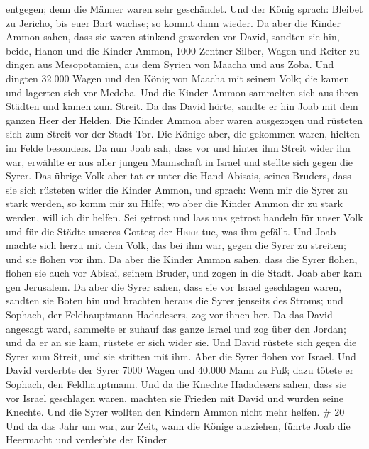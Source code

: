 entgegen; denn die Männer waren sehr geschändet. Und der König sprach:
Bleibet zu Jericho, bis euer Bart wachse; so kommt dann wieder.
 Da aber die Kinder Ammon sahen, dass sie waren stinkend
geworden vor David, sandten sie hin, beide, Hanon und die Kinder Ammon,
1000 Zentner Silber, Wagen und Reiter zu dingen aus Mesopotamien, aus
dem Syrien von Maacha und aus Zoba.  Und dingten 32.000
Wagen und den König von Maacha mit seinem Volk; die kamen und lagerten
sich vor Medeba. Und die Kinder Ammon sammelten sich aus ihren Städten
und kamen zum Streit.  Da das David hörte, sandte er hin
Joab mit dem ganzen Heer der Helden.  Die Kinder Ammon
aber waren ausgezogen und rüsteten sich zum Streit vor der Stadt Tor.
Die Könige aber, die gekommen waren, hielten im Felde besonders.
 Da nun Joab sah, dass vor und hinter ihm Streit wider
ihn war, erwählte er aus aller jungen Mannschaft in Israel und stellte
sich gegen die Syrer.  Das übrige Volk aber tat er unter
die Hand Abisais, seines Bruders, dass sie sich rüsteten wider die
Kinder Ammon,  und sprach: Wenn mir die Syrer zu stark
werden, so komm mir zu Hilfe; wo aber die Kinder Ammon dir zu stark
werden, will ich dir helfen.  Sei getrost und lass uns
getrost handeln für unser Volk und für die Städte unseres Gottes; der
\textsc{Herr} tue, was ihm gefällt.  Und Joab machte sich
herzu mit dem Volk, das bei ihm war, gegen die Syrer zu streiten; und
sie flohen vor ihm.  Da aber die Kinder Ammon sahen, dass
die Syrer flohen, flohen sie auch vor Abisai, seinem Bruder, und zogen
in die Stadt. Joab aber kam gen Jerusalem.  Da aber die
Syrer sahen, dass sie vor Israel geschlagen waren, sandten sie Boten hin
und brachten heraus die Syrer jenseits des Stroms; und Sophach, der
Feldhauptmann Hadadesers, zog vor ihnen her.  Da das
David angesagt ward, sammelte er zuhauf das ganze Israel und zog über
den Jordan; und da er an sie kam, rüstete er sich wider sie. Und David
rüstete sich gegen die Syrer zum Streit, und sie stritten mit ihm.
 Aber die Syrer flohen vor Israel. Und David verderbte
der Syrer 7000 Wagen und 40.000 Mann zu Fuß; dazu tötete er Sophach, den
Feldhauptmann.  Und da die Knechte Hadadesers sahen, dass
sie vor Israel geschlagen waren, machten sie Frieden mit David und
wurden seine Knechte. Und die Syrer wollten den Kindern Ammon nicht mehr
helfen. \# 20  Und da das Jahr um war, zur Zeit, wann die
Könige ausziehen, führte Joab die Heermacht und verderbte der Kinder
